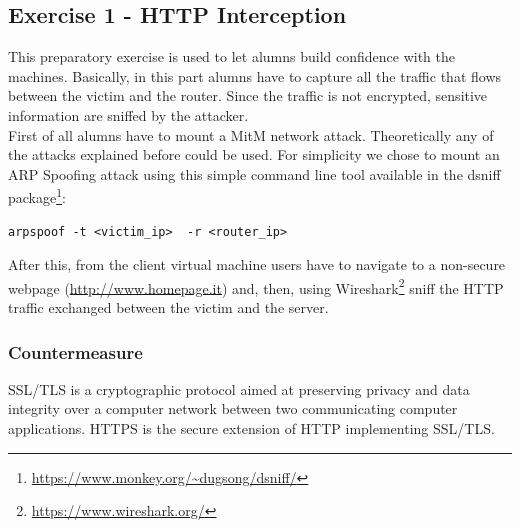 \documentclass[final]{article}
\begin{document}
\subsection{Exercise 1 - HTTP Interception}
This preparatory exercise is used to let alumns build confidence with the machines.
Basically, in this part alumns have to capture all the traffic that flows between the victim and the router.
Since the traffic is not encrypted, sensitive information are sniffed by the attacker. \\
First of all alumns have to mount a \ac{MitM} network attack.
Theoretically any of the attacks explained before could be used.
For simplicity we chose to mount an ARP Spoofing attack using this simple command line tool available in the dsniff package\footnote{\url{https://www.monkey.org/~dugsong/dsniff/}}:
\begin{lstlisting}
arpspoof -t <victim_ip>  -r <router_ip>
\end{lstlisting}
After this, from the client virtual machine users have to navigate to a non-secure webpage (\url{http://www.homepage.it})
and, then, using Wireshark\footnote{\url{https://www.wireshark.org/}} sniff the HTTP traffic exchanged between the victim and the server.
\subsubsection{Countermeasure}
SSL/TLS is a cryptographic protocol aimed at preserving privacy and data integrity over a computer network between two communicating computer applications.
HTTPS is the secure extension of HTTP implementing SSL/TLS.
\newpage
\end{document}
